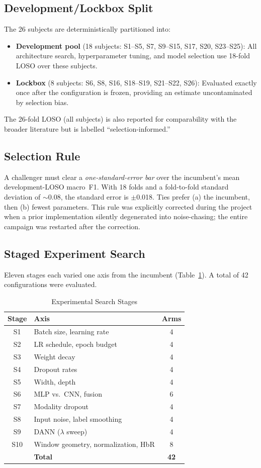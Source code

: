 \documentclass[conference]{IEEEtran}
\begin{document}
\subsection{Development/Lockbox Split}
The 26 subjects are deterministically partitioned into:
\begin{itemize}
    \item \textbf{Development pool} (18 subjects: S1--S5, S7, S9--S15, S17, S20, S23--S25): All architecture search, hyperparameter tuning, and model selection use 18-fold LOSO over these subjects.
    \item \textbf{Lockbox} (8 subjects: S6, S8, S16, S18--S19, S21--S22, S26): Evaluated exactly once after the configuration is frozen, providing an estimate uncontaminated by selection bias.
\end{itemize}

The 26-fold LOSO (all subjects) is also reported for comparability with the broader literature but is labelled ``selection-informed.''

\subsection{Selection Rule}
A challenger must clear a \emph{one-standard-error bar} over the incumbent's mean development-LOSO macro~F1. With 18 folds and a fold-to-fold standard deviation of $\sim$0.08, the standard error is $\pm$0.018. Ties prefer (a) the incumbent, then (b) fewest parameters. This rule was explicitly corrected during the project when a prior implementation silently degenerated into noise-chasing; the entire campaign was restarted after the correction.

\subsection{Staged Experiment Search}
Eleven stages each varied one axis from the incumbent (Table~\ref{tab:stages}). A total of 42 configurations were evaluated.

\begin{table}[t]
\centering
\caption{Experimental Search Stages}
\label{tab:stages}
\begin{tabular}{clc}
\toprule
\textbf{Stage} & \textbf{Axis} & \textbf{Arms} \\
\midrule
S1 & Batch size, learning rate & 4 \\
S2 & LR schedule, epoch budget & 4 \\
S3 & Weight decay & 4 \\
S4 & Dropout rates & 4 \\
S5 & Width, depth & 4 \\
S6 & MLP vs.\ CNN, fusion & 6 \\
S7 & Modality dropout & 4 \\
S8 & Input noise, label smoothing & 4 \\
S9 & DANN ($\lambda$ sweep) & 4 \\
S10 & Window geometry, normalization, HbR & 8 \\
\midrule
& \textbf{Total} & \textbf{42} \\
\bottomrule
\end{tabular}
\end{table}
\end{document}
